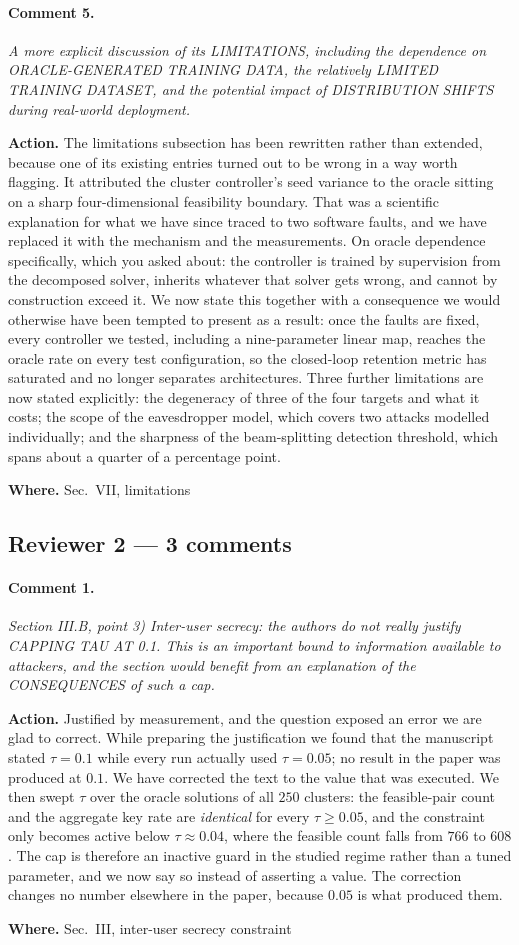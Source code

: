\documentclass[10pt]{article}
\newcommand{\rev}[1]{\par\medskip\noindent\textit{#1}\par\smallskip}
\newcommand{\act}[2]{\noindent\textbf{Action.} #1\par\noindent\textbf{Where.} #2\par}
\begin{document}
\paragraph{Comment 5.}
\rev{A more explicit discussion of its LIMITATIONS, including the dependence on ORACLE-GENERATED TRAINING DATA, the relatively LIMITED TRAINING DATASET, and the potential impact of DISTRIBUTION SHIFTS during real-world deployment.}
\act{The limitations subsection has been rewritten rather than extended, because one of its existing entries turned out to be wrong in a way worth flagging. It attributed the cluster controller's seed variance to the oracle sitting on a sharp four-dimensional feasibility boundary. That was a scientific explanation for what we have since traced to two software faults, and we have replaced it with the mechanism and the measurements. On oracle dependence specifically, which you asked about: the controller is trained by supervision from the decomposed solver, inherits whatever that solver gets wrong, and cannot by construction exceed it. We now state this together with a consequence we would otherwise have been tempted to present as a result: once the faults are fixed, every controller we tested, including a nine-parameter linear map, reaches the oracle rate on every test configuration, so the closed-loop retention metric has saturated and no longer separates architectures. Three further limitations are now stated explicitly: the degeneracy of three of the four targets and what it costs; the scope of the eavesdropper model, which covers two attacks modelled individually; and the sharpness of the beam-splitting detection threshold, which spans about a quarter of a percentage point.}{Sec.~VII, limitations}

\subsection*{Reviewer 2 --- 3 comments}

\paragraph{Comment 1.}
\rev{Section III.B, point 3) Inter-user secrecy: the authors do not really justify CAPPING TAU AT 0.1. This is an important bound to information available to attackers, and the section would benefit from an explanation of the CONSEQUENCES of such a cap.}
\act{Justified by measurement, and the question exposed an error we are glad to correct. While preparing the justification we found that the manuscript stated $\tau{=}0.1$ while every run actually used $\tau{=}0.05$; no result in the paper was produced at $0.1$. We have corrected the text to the value that was executed. We then swept $\tau$ over the oracle solutions of all $250$ clusters: the feasible-pair count and the aggregate key rate are \emph{identical} for every $\tau \ge 0.05$, and the constraint only becomes active below $\tau \approx 0.04$, where the feasible count falls from $766$ to $608$. The cap is therefore an inactive guard in the studied regime rather than a tuned parameter, and we now say so instead of asserting a value. The correction changes no number elsewhere in the paper, because $0.05$ is what produced them.}{Sec.~III, inter-user secrecy constraint}
\end{document}
